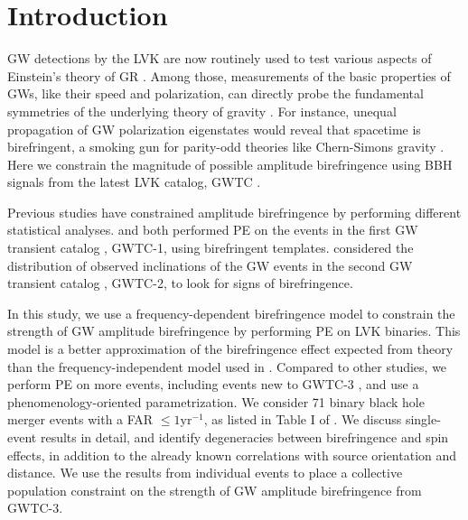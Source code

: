 \documentclass[aps,prd,twocolumn,superscriptaddress,preprintnumbers,floatfix,nofootinbib]{revtex4-2}
\begin{document}
\section{Introduction}
\label{sec:Introduction}
\Ac{GW} detections by the \ac{LVK} \citep{LIGO, Virgo, KAGRA} are now routinely used to test various aspects of Einstein's theory of \ac{GR} \citep{LIGOScientific:2016lio,LIGOScientific:2018dkp,LIGOScientific:2021sio}.
Among those, measurements of the basic properties of \acp{GW}, like their speed and polarization, can directly probe the fundamental symmetries of the underlying theory of gravity \citep{Will:2018bme}.
For instance, unequal propagation of \ac{GW} polarization eigenstates would reveal that spacetime is birefringent, a smoking gun for parity-odd theories like Chern-Simons gravity \citep{Jackiw:2003pm,Alexander:2009tp,Sopuerta:2009iy}.
Here we constrain the magnitude of possible amplitude birefringence using \ac{BBH} signals from the latest \ac{LVK} catalog, GWTC \citep{GWTC-3}.

Previous studies have constrained amplitude birefringence by performing different statistical analyses.
\citet{Yamada_2020} and \citet{Wang_2021} both performed \ac{PE} on the events in the first \ac{GW} transient catalog \citep{GWTC-1}, GWTC-1, using birefringent templates.
\citet{Okounkova_2022} considered the distribution of observed inclinations of the \ac{GW} events in the second \ac{GW} transient catalog \citep{GWTC-2}, GWTC-2, to look for signs of birefringence.

In this study, we use a frequency-dependent birefringence model to constrain the strength of \ac{GW} amplitude birefringence by performing \ac{PE} on \ac{LVK} binaries.
This model is a better approximation of the birefringence effect expected from theory than the frequency-independent model used in \citet{Okounkova_2022}.
Compared to other studies, we perform \ac{PE} on more events, including events new to GWTC-3 \citep{GWTC-3}, and use a phenomenology-oriented parametrization.
We consider 71 binary black hole merger events with a \ac{FAR} $\leq1\mathrm{yr^{-1}}$, as listed in Table I of \citet{GWTC-3_population}.
We discuss single-event results in detail, and identify degeneracies between birefringence and spin effects, in addition to the already known correlations with source orientation and distance.
We use the results from individual events to place a collective population constraint on the strength of \ac{GW} amplitude birefringence from GWTC-3.
\end{document}
